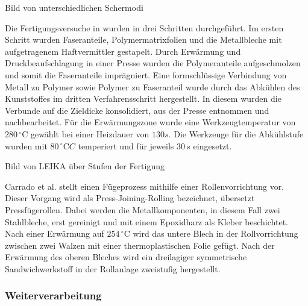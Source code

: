 Bild von unterschiedlichen Schermodi



Die Fertigungsversuche in \cite{LEIKA.2017} wurden in drei Schritten durchgeführt.
Im ersten Schritt wurden Faseranteile, Polymermatrixfolien und die Metallbleche mit aufgetragenem Haftvermittler gestapelt.
Durch Erwärmung und Druckbeaufschlagung in einer Presse wurden die Polymeranteile aufgeschmolzen und somit die Faseranteile imprägniert.
Eine formschlüssige Verbindung von Metall zu Polymer sowie Polymer zu Faseranteil wurde durch das Abkühlen des Kunststoffes im dritten Verfahrensschritt hergestellt.
In diesem wurden die Verbunde auf die Zieldicke konsolidiert, aus der Presse entnommen und nachbearbeitet.
Für die Erwärmungszone wurde eine Werkzeugtemperatur von $280\, ^\circ \text{C}$ gewählt bei einer Heizdauer von $130 s$.
Die Werkzeuge für die Abkühlstufe wurden mit $80\, ^\circ\text{C} C$ temperiert und für jeweils $30\, s$ eingesetzt. \cite{LEIKA.2017}

Bild von LEIKA über Stufen der Fertigung

Carrado et al. \cite{Carrado.2010} stellt einen Fügeprozess mithilfe einer Rollenvorrichtung vor.
Dieser Vorgang wird als Press-Joining-Rolling bezeichnet, übersetzt Pressfügerollen.
Dabei werden die Metallkomponenten, in diesem Fall zwei Stahlbleche, erst gereinigt und mit einem Epoxidharz als Kleber beschichtet.
Nach einer Erwärmung auf $254 \, ^\circ \text{C}$ wird das untere Blech in der Rollvorrichtung zwischen zwei Walzen mit einer thermoplastischen Folie gefügt.
Nach der Erwärmung des oberen Bleches wird ein dreilagiger symmetrische Sandwichwerkstoff in der Rollanlage zweistufig hergestellt.



\subsubsection{Weiterverarbeitung}


